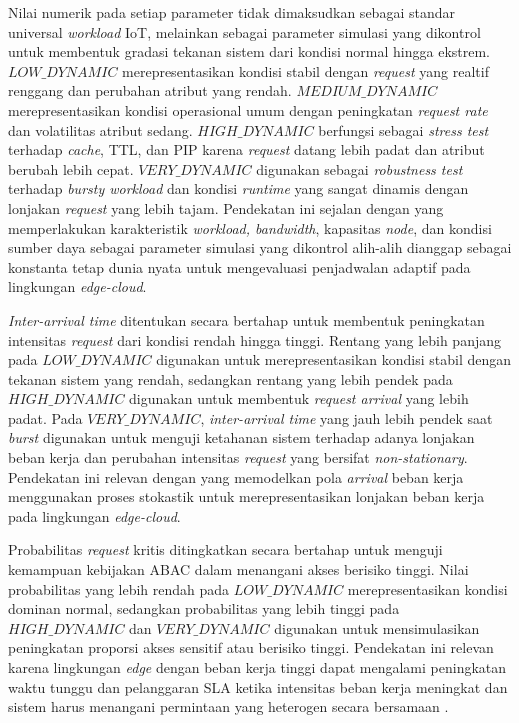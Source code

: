 Nilai numerik pada setiap parameter tidak dimaksudkan sebagai standar universal \textit{workload} IoT, melainkan sebagai parameter simulasi yang dikontrol untuk membentuk gradasi tekanan sistem dari kondisi normal hingga ekstrem. $LOW\_DYNAMIC$ merepresentasikan kondisi stabil dengan \textit{request} yang realtif renggang dan perubahan atribut yang rendah. $MEDIUM\_DYNAMIC$ merepresentasikan kondisi operasional umum dengan peningkatan \textit{request rate} dan volatilitas atribut sedang. $HIGH\_DYNAMIC$ berfungsi sebagai \textit{stress test} terhadap \textit{cache}, TTL, dan PIP karena \textit{request} datang lebih padat dan atribut berubah lebih cepat. $VERY\_DYNAMIC$ digunakan sebagai \textit{robustness test} terhadap \textit{bursty workload} dan kondisi \textit{runtime} yang sangat dinamis dengan lonjakan \textit{request} yang lebih tajam. Pendekatan ini sejalan dengan \textcite{raju_intellischeduler_2026} yang memperlakukan karakteristik \textit{workload, bandwidth}, kapasitas \textit{node}, dan kondisi sumber daya sebagai parameter simulasi yang dikontrol alih-alih dianggap sebagai konstanta tetap dunia nyata untuk mengevaluasi penjadwalan adaptif pada lingkungan \textit{edge-cloud}.

\textit{Inter-arrival time} ditentukan secara bertahap untuk membentuk peningkatan intensitas \textit{request} dari kondisi rendah hingga tinggi. Rentang yang lebih panjang pada $LOW\_DYNAMIC$ digunakan untuk merepresentasikan kondisi stabil dengan tekanan sistem yang rendah, sedangkan rentang yang lebih pendek pada $HIGH\_DYNAMIC$ digunakan untuk membentuk \textit{request arrival} yang lebih padat. Pada $VERY\_DYNAMIC$, \textit{inter-arrival time} yang jauh lebih pendek saat \textit{burst} digunakan untuk menguji ketahanan sistem terhadap adanya lonjakan beban kerja dan perubahan intensitas \textit{request} yang bersifat \textit{non-stationary}. Pendekatan ini relevan dengan \textcite{raju_intellischeduler_2026} yang memodelkan pola \textit{arrival} beban kerja menggunakan proses stokastik untuk merepresentasikan lonjakan beban kerja pada lingkungan \textit{edge-cloud}.

Probabilitas \textit{request} kritis ditingkatkan secara bertahap untuk menguji kemampuan kebijakan ABAC dalam menangani akses berisiko tinggi. Nilai probabilitas yang lebih rendah pada $LOW\_DYNAMIC$ merepresentasikan kondisi dominan normal, sedangkan probabilitas yang lebih tinggi pada $HIGH\_DYNAMIC$ dan $VERY\_DYNAMIC$ digunakan untuk mensimulasikan peningkatan proporsi akses sensitif atau berisiko tinggi. Pendekatan ini relevan karena lingkungan \textit{edge} dengan beban kerja tinggi dapat mengalami peningkatan waktu tunggu dan pelanggaran SLA ketika intensitas beban kerja meningkat dan sistem harus menangani permintaan yang heterogen secara bersamaan \parencite{raju_intellischeduler_2026}.

